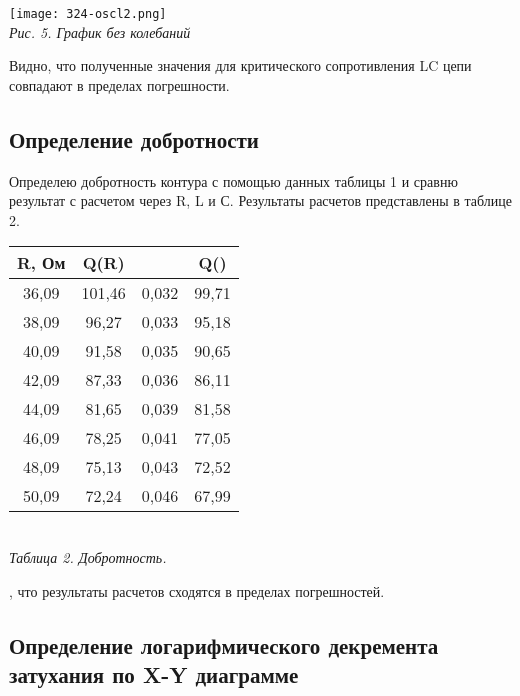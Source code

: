 \begin{center}

    \texttt{[image: 324-oscl2.png]} \\
    \textit{Рис. 5. График без колебаний}

\end{center}

Видно, что полученные значения для критического сопротивления LC цепи совпадают в пределах погрешности.

\newpage

\subsection{Определение добротности}

Определею добротность контура с помощью данных таблицы 1 и сравню результат с расчетом через R, L и С. Результаты расчетов представлены в таблице 2.

\begin{table}[!h]
    \begin{center}
    \begin{tabular}{|c|c|c|c|}
    \hline
    R, Ом & Q(R)   & \mth{\Theta} &  Q(\mth{\Theta}) \\ \hline
    36,09 & 101,46 &     0,032    &       99,71      \\ \hline
    38,09 & 96,27  &     0,033    &       95,18      \\ \hline
    40,09 & 91,58  &     0,035    &       90,65      \\ \hline
    42,09 & 87,33  &     0,036    &       86,11      \\ \hline
    44,09 & 81,65  &     0,039    &       81,58      \\ \hline
    46,09 & 78,25  &     0,041    &       77,05      \\ \hline
    48,09 & 75,13  &     0,043    &       72,52      \\ \hline
    50,09 & 72,24  &     0,046    &       67,99      \\ \hline
    \end{tabular} \\ [0.2cm]
    \textit{Таблица 2. Добротность.}
    \end{center}
\end{table}

, что результаты расчетов сходятся в пределах погрешностей.

\subsection{Определение логарифмического декремента затухания по X-Y диаграмме}

